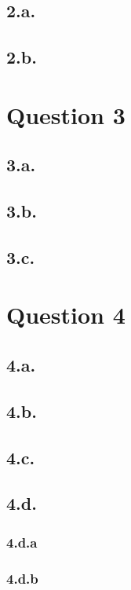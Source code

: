 \documentclass[12pt]{article}
\begin{document}
\subsection{2.a.}
\subsection{2.b.}


\section{Question 3}

\subsection{3.a.}
\subsection{3.b.}
\subsection{3.c.}


\section{Question 4}

\subsection{4.a.}
\subsection{4.b.}
\subsection{4.c.}
\subsection{4.d.}
\subsubsection{4.d.a}
\subsubsection{4.d.b}

%
% 
% 
\end{document}
